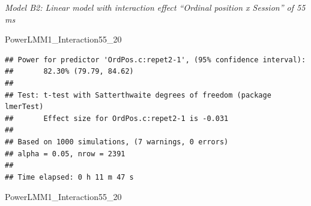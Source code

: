 \documentclass[
]{article}
\newenvironment{Shaded}{\begin{snugshade}}{\end{snugshade}}
\newcommand{\AttributeTok}[1]{\textcolor[rgb]{0.77,0.63,0.00}{#1}}
\newcommand{\CommentTok}[1]{\textcolor[rgb]{0.56,0.35,0.01}{\textit{#1}}}
\newcommand{\FunctionTok}[1]{\textcolor[rgb]{0.00,0.00,0.00}{#1}}
\newcommand{\NormalTok}[1]{#1}
\newcommand{\OtherTok}[1]{\textcolor[rgb]{0.56,0.35,0.01}{#1}}
\newcommand{\SpecialCharTok}[1]{\textcolor[rgb]{0.00,0.00,0.00}{#1}}
\newcommand{\StringTok}[1]{\textcolor[rgb]{0.31,0.60,0.02}{#1}}
\begin{document}
\emph{Model B2: Linear model with interaction effect ``Ordinal position
x Session'' of 55 ms}

\begin{Shaded}
\end{Shaded}

\begin{Shaded}
\begin{Highlighting}[]
\NormalTok{PowerLMM1\_Interaction55\_20}
\end{Highlighting}
\end{Shaded}

\begin{verbatim}
## Power for predictor 'OrdPos.c:repet2-1', (95% confidence interval):
##       82.30% (79.79, 84.62)
## 
## Test: t-test with Satterthwaite degrees of freedom (package lmerTest)
##       Effect size for OrdPos.c:repet2-1 is -0.031
## 
## Based on 1000 simulations, (7 warnings, 0 errors)
## alpha = 0.05, nrow = 2391
## 
## Time elapsed: 0 h 11 m 47 s
\end{verbatim}

\begin{Shaded}
\end{Shaded}

\begin{Shaded}
\begin{Highlighting}[]
\NormalTok{PowerLMM1\_Interaction55\_20}
\end{Highlighting}
\end{Shaded}
\end{document}
